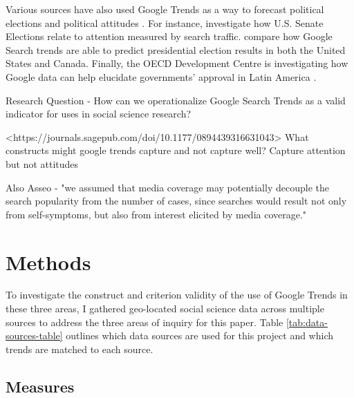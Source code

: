 Various sources have also used Google Trends as a way to forecast
political elections and political attitudes
\citep{wolfTrendingRightDirection2018}. For instance,
\citet{swearingenGoogleInsightsSenate2014} investigate how U.S. Senate
Elections relate to attention measured by search traffic.
\citet{prado-romanGoogleTrendsPredictor2020} compare how Google Search trends
are able to predict presidential election results in both the United
States and Canada. Finally, the OECD Development Centre is investigating
how Google data can help elucidate governments' approval in Latin
America \citep{montoyaUsingGoogleData2020}.

Research Question - How can we operationalize Google Search Trends as a
valid indicator for uses in social science research?

<https://journals.sagepub.com/doi/10.1177/0894439316631043> What
constructs might google trends capture and not capture well? Capture
attention but not attitudes

Also Asseo - "we assumed that media coverage may potentially decouple
the search popularity from the number of cases, since searches would
result not only from self-symptoms, but also from interest elicited by
media coverage."

\section{Methods}
To investigate the construct and criterion validity of the use of Google Trends
in these three areas, I gathered geo-located social science data across multiple
sources to address the three areas of inquiry for this paper.  Table
\ref{tab:data-sources-table} outlines which data sources are used for this
project and which trends are matched to each source.



\subsection{Measures}

